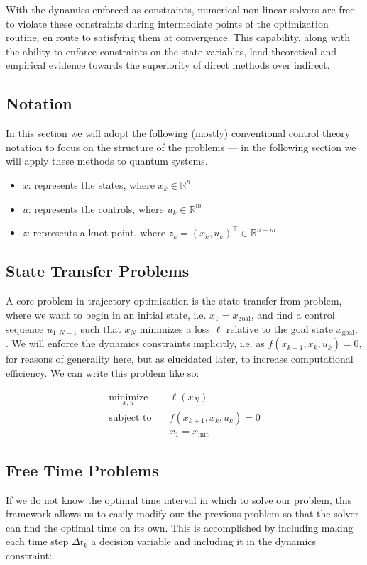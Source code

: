 \documentclass{article}
\newcommand{\minimize}[1]{\underset{#1}{\text{minimize}}}
\newcommand{\st}{\text{subject to}}
\begin{document}
With the dynamics enforced as constraints, numerical non-linear solvers are free to violate these constraints during intermediate points of the optimization routine, en route to satisfying them at convergence.  This capability, along with the ability to enforce constraints on the state variables, lend theoretical and empirical evidence towards the superiority of direct methods over indirect. 

\subsection{Notation}
In this section we will adopt the following (mostly) conventional control theory notation to focus on the structure of the problems  --- in the following section we will apply these methods to quantum systems.

\begin{itemize}
  \item $x$: represents the states, where $x_k \in \mathbb{R}^n$
  \item $u$: represents the controls, where $u_k \in \mathbb{R}^m$
  \item $z$: represents a knot point, where $z_k = (x_k, u_k)^\top \in \mathbb{R}^{n+m}$
\end{itemize}

\subsection{State Transfer Problems}

A core problem in trajectory optimization is the state transfer from problem, where we want to begin in an initial state, i.e. $x_1 = x_{\text{goal}}$, and find a control sequence $u_{1:N-1}$ such that $x_N$ minimizes a loss $\ell$ relative to the goal state $x_{\text{goal}}$, .  We will enforce the dynamics constraints implicitly, i.e. as $f(x_{k+1}, x_k, u_k) = 0$, for reasons of generality here, but as elucidated later, to increase computational efficiency. We can write this problem like so: 

\begin{align}
  \minimize{x, u} \quad & \ell(x_N) \\
  \st \quad & f(x_{k+1}, x_k, u_k) = 0 \\
            & x_1 = x_{\text{init}} 
\end{align}

\subsection{Free Time Problems}
If we do not know the optimal time interval in which to solve our problem, this framework allows us to easily modify our the previous problem so that the solver can find the optimal time on its own.  This is accomplished by including making each time step $\Delta t_k$ a decision variable and including it in the dynamics constraint:
\end{document}

